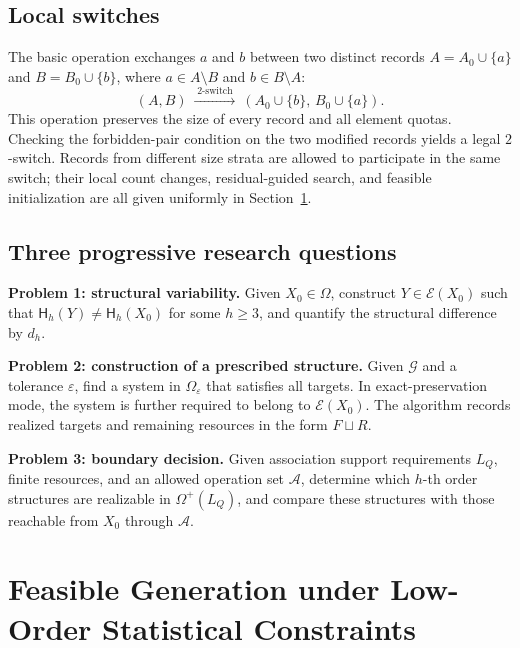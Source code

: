 \documentclass[11pt,a4paper]{article}
\numberwithin{equation}{section}
\theoremstyle{definition}
\numberwithin{algorithm}{section}
\begin{document}
\subsection{Local switches}\label{subsec:model-switch}

The basic operation exchanges $a$ and $b$ between two distinct records
$A=A_0\cup\{a\}$ and $B=B_0\cup\{b\}$, where $a\in A\setminus B$ and $b\in B\setminus A$:
\begin{equation}
(A,B)\ \xrightarrow{\;2\text{-switch}\;}\
(A_0\cup\{b\},\,B_0\cup\{a\}).
\label{eq:2switch}
\end{equation}
This operation preserves the size of every record and all element quotas.
Checking the forbidden-pair condition on the two modified records yields a legal $2$-switch.
Records from different size strata are allowed to participate in the same switch;
their local count changes, residual-guided search, and feasible initialization are all
given uniformly in Section~\ref{sec:baseline}.

\subsection{Three progressive research questions}\label{subsec:model-questions}

\noindent\textbf{Problem 1: structural variability.}
Given $X_0\in\Omega$, construct $Y\in\mathcal E(X_0)$ such that
$\mathsf H_h(Y)\neq\mathsf H_h(X_0)$ for some $h\ge3$, and quantify the structural
difference by $d_h$.

\smallskip
\noindent\textbf{Problem 2: construction of a prescribed structure.}
Given $\mathcal G$ and a tolerance $\varepsilon$, find a system in $\Omega_\varepsilon$
that satisfies all targets.
In exact-preservation mode, the system is further required to belong to $\mathcal E(X_0)$.
The algorithm records realized targets and remaining resources in the form $F\sqcup R$.

\smallskip
\noindent\textbf{Problem 3: boundary decision.}
Given association support requirements $L_Q$, finite resources, and an allowed operation
set $\mathcal A$, determine which $h$-th order structures are realizable in
$\Omega^+(L_Q)$, and compare these structures with those reachable from $X_0$ through
$\mathcal A$.

\section{Feasible Generation under Low-Order Statistical Constraints}\label{sec:baseline}
\end{document}
